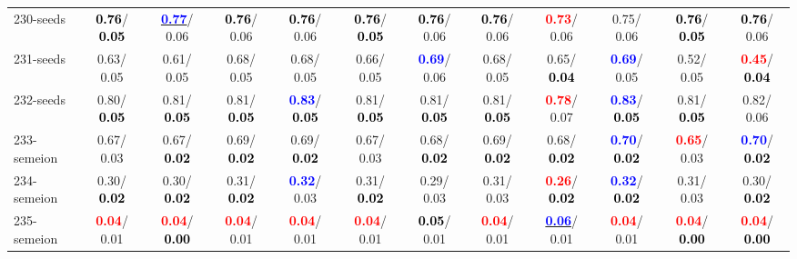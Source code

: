 \begin{table}[h]
\begin{center}
{\begin{tabular}{lc|c|c|c|c|c|c|c|c|c|c}
230-seeds & \textcolor{black}{\textbf{  0.76}}/\textcolor{black}{\textbf{  0.05}} & \underline{\textcolor{blue}{\textbf{  0.77}}}/  0.06 & \textcolor{black}{\textbf{  0.76}}/  0.06 & \textcolor{black}{\textbf{  0.76}}/  0.06 & \textcolor{black}{\textbf{  0.76}}/\textcolor{black}{\textbf{  0.05}} & \textcolor{black}{\textbf{  0.76}}/  0.06 & \textcolor{black}{\textbf{  0.76}}/  0.06 & \textcolor{red}{\textbf{  0.73}}/  0.06 &   0.75/  0.06 & \textcolor{black}{\textbf{  0.76}}/\textcolor{black}{\textbf{  0.05}} & \textcolor{black}{\textbf{  0.76}}/  0.06 \\
231-seeds &   0.63/  0.05 &   0.61/  0.05 &   0.68/  0.05 &   0.68/  0.05 &   0.66/  0.05 & \textcolor{blue}{\textbf{  0.69}}/  0.06 &   0.68/  0.05 &   0.65/\textcolor{black}{\textbf{  0.04}} & \textcolor{blue}{\textbf{  0.69}}/  0.05 &   0.52/  0.05 & \textcolor{red}{\textbf{  0.45}}/\textcolor{black}{\textbf{  0.04}} \\ \hline
232-seeds &   0.80/\textcolor{black}{\textbf{  0.05}} &   0.81/\textcolor{black}{\textbf{  0.05}} &   0.81/\textcolor{black}{\textbf{  0.05}} & \textcolor{blue}{\textbf{  0.83}}/\textcolor{black}{\textbf{  0.05}} &   0.81/\textcolor{black}{\textbf{  0.05}} &   0.81/\textcolor{black}{\textbf{  0.05}} &   0.81/\textcolor{black}{\textbf{  0.05}} & \textcolor{red}{\textbf{  0.78}}/  0.07 & \textcolor{blue}{\textbf{  0.83}}/\textcolor{black}{\textbf{  0.05}} &   0.81/\textcolor{black}{\textbf{  0.05}} &   0.82/  0.06 \\
233-semeion &   0.67/  0.03 &   0.67/\textcolor{black}{\textbf{  0.02}} &   0.69/\textcolor{black}{\textbf{  0.02}} &   0.69/\textcolor{black}{\textbf{  0.02}} &   0.67/  0.03 &   0.68/\textcolor{black}{\textbf{  0.02}} &   0.69/\textcolor{black}{\textbf{  0.02}} &   0.68/\textcolor{black}{\textbf{  0.02}} & \textcolor{blue}{\textbf{  0.70}}/\textcolor{black}{\textbf{  0.02}} & \textcolor{red}{\textbf{  0.65}}/  0.03 & \textcolor{blue}{\textbf{  0.70}}/\textcolor{black}{\textbf{  0.02}} \\
234-semeion &   0.30/\textcolor{black}{\textbf{  0.02}} &   0.30/\textcolor{black}{\textbf{  0.02}} &   0.31/\textcolor{black}{\textbf{  0.02}} & \textcolor{blue}{\textbf{  0.32}}/  0.03 &   0.31/\textcolor{black}{\textbf{  0.02}} &   0.29/  0.03 &   0.31/  0.03 & \textcolor{red}{\textbf{  0.26}}/\textcolor{black}{\textbf{  0.02}} & \textcolor{blue}{\textbf{  0.32}}/\textcolor{black}{\textbf{  0.02}} &   0.31/  0.03 &   0.30/\textcolor{black}{\textbf{  0.02}} \\
235-semeion & \textcolor{red}{\textbf{  0.04}}/  0.01 & \textcolor{red}{\textbf{  0.04}}/\textcolor{black}{\textbf{  0.00}} & \textcolor{red}{\textbf{  0.04}}/  0.01 & \textcolor{red}{\textbf{  0.04}}/  0.01 & \textcolor{red}{\textbf{  0.04}}/  0.01 & \textcolor{black}{\textbf{  0.05}}/  0.01 & \textcolor{red}{\textbf{  0.04}}/  0.01 & \underline{\textcolor{blue}{\textbf{  0.06}}}/  0.01 & \textcolor{red}{\textbf{  0.04}}/  0.01 & \textcolor{red}{\textbf{  0.04}}/\textcolor{black}{\textbf{  0.00}} & \textcolor{red}{\textbf{  0.04}}/\textcolor{black}{\textbf{  0.00}} \\

\end{tabular}}
\end{center}
\end{table}
